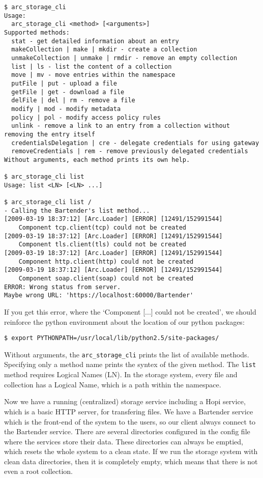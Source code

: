 \documentclass{book}
\begin{document}
\begin{verbatim}
$ arc_storage_cli
Usage:
  arc_storage_cli <method> [<arguments>]
Supported methods:
  stat - get detailed information about an entry
  makeCollection | make | mkdir - create a collection
  unmakeCollection | unmake | rmdir - remove an empty collection
  list | ls - list the content of a collection
  move | mv - move entries within the namespace
  putFile | put - upload a file
  getFile | get - download a file
  delFile | del | rm - remove a file
  modify | mod - modify metadata
  policy | pol - modify access policy rules
  unlink - remove a link to an entry from a collection without removing the entry itself
  credentialsDelegation | cre - delegate credentials for using gateway
  removeCredentials | rem - remove previously delegated credentials
Without arguments, each method prints its own help.

$ arc_storage_cli list
Usage: list <LN> [<LN> ...]

$ arc_storage_cli list /
- Calling the Bartender's list method...
[2009-03-19 18:37:12] [Arc.Loader] [ERROR] [12491/152991544]
    Component tcp.client(tcp) could not be created
[2009-03-19 18:37:12] [Arc.Loader] [ERROR] [12491/152991544]
    Component tls.client(tls) could not be created
[2009-03-19 18:37:12] [Arc.Loader] [ERROR] [12491/152991544]
    Component http.client(http) could not be created
[2009-03-19 18:37:12] [Arc.Loader] [ERROR] [12491/152991544]
    Component soap.client(soap) could not be created
ERROR: Wrong status from server.
Maybe wrong URL: 'https://localhost:60000/Bartender'
\end{verbatim}

If you get this error, where the `Component [...] could not be created', we should reinforce the python environment about the location of our python packages:

\begin{verbatim}
$ export PYTHONPATH=/usr/local/lib/python2.5/site-packages/
\end{verbatim}

Without arguments, the \verb!arc_storage_cli! prints the list of available methods. Specifying only a method name prints the syntex of the given method. The \verb!list! method requires Logical Names (LN). In the storage system, every file and collection has a Logical Name, which is a path within the namespace.

Now we have a running (centralized) storage service including a Hopi service, which is a basic HTTP server, for transfering files. We have a Bartender service which is the front-end of the system to the users, so our client always connect to the Bartender service. There are several directories configured in the config file where the services store their data. These directories can always be emptied, which resets the whole system to a clean state. If we run the storage system with clean data directories, then it is completely empty, which means that there is not even a root collection.
\end{document}
